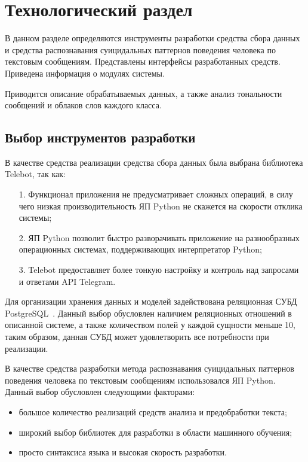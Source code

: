 \section{Технологический раздел}

В данном разделе определяются инструменты разработки средства сбора данных и средства распознавания суицидальных паттернов поведения человека по текстовым сообщениям.
Представлены интерфейсы разработанных средств. Приведена информация о модулях системы.

Приводится описание обрабатываемых данных, а также анализ тональности сообщений и облаков слов каждого класса.

\subsection{Выбор инструментов разработки}

В качестве средства реализации средства сбора данных была выбрана библиотека Telebot, так как:

\begin{enumerate}
	\item[1.] Функционал приложения не предусматривает сложных операций, в силу чего низкая производительность ЯП Python не скажется на скорости отклика системы;
	\item[2.] ЯП Python позволит быстро разворачивать приложение на разнообразных операционных системах, поддерживающих интерпретатор Python;
	\item[3.] Telebot предоставляет более тонкую настройку и контроль над запросами и ответами API Telegram.
\end{enumerate}

Для организации хранения данных и моделей задействована реляционная СУБД PostgreSQL~\cite{postgres}. 
Данный выбор обусловлен наличием реляционных отношений в описанной системе, а также количеством полей у каждой сущности меньше 10, таким образом, данная СУБД может удовлетворить все потребности при реализации.

В качестве средства разработки метода распознавания суицидальных паттернов поведения человека по текстовым сообщениям использовался ЯП Python. Данный выбор обусловлен следующими факторами:

\begin{itemize}
	\item большое количество реализаций средств анализа и предобработки текста;
	\item широкий выбор библиотек для разработки в области машинного обучения;
	\item просто синтаксиса языка и высокая скорость разработки.
\end{itemize}

